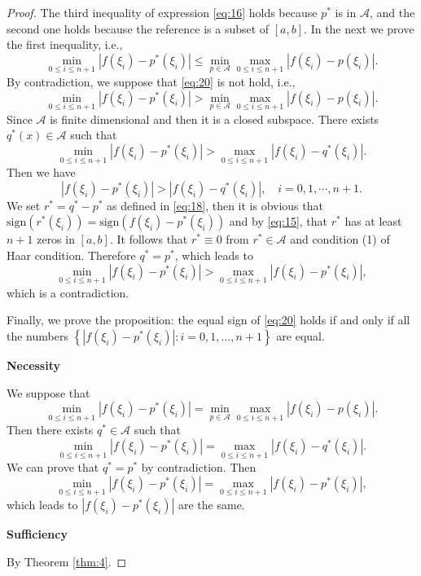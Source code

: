 \documentclass[11pt]{article}
\begin{document}
\begin{proof}
The third inequality of expression \eqref{eq:16} holds because $p^{*}$ is in $\mathscr{A}$, and the second one holds because the reference is a subset of $[a, b]$. In the next we prove the first inequality, i.e.,
\begin{equation}
\min_{0\leqslant i \leqslant n+1} |f(\xi_i) - p^*(\xi_i)| \leqslant 
\min_{p\in\mathscr{A}} \max_{0\leqslant i \leqslant n+1} |f(\xi_i) - p(\xi_i)|.
\label{eq:20}
\end{equation}
By contradiction, we suppose that \eqref{eq:20} is not hold, i.e.,
\[
\min_{0\leqslant i \leqslant n+1} |f(\xi_i) - p^*(\xi_i)| >
\min_{p\in\mathscr{A}} \max_{0\leqslant i \leqslant n+1} |f(\xi_i) - p(\xi_i)|.
\]
Since $\mathscr{A}$ is finite dimensional and then it is a closed subspace. There exists $q^*(x) \in \mathscr{A}$ such that
\[
\min_{0\leqslant i \leqslant n+1} |f(\xi_i) - p^*(\xi_i)| >
\max_{0\leqslant i \leqslant n+1} |f(\xi_i) - q^*(\xi_i)|.
\]
Then we have 
\[
|f(\xi_i) - p^*(\xi_i)| > |f(\xi_i) - q^*(\xi_i)|,\quad i=0,1,\cdots,n+1.
\]
We set $r^* = q^* - p^*$ as defined in \eqref{eq:18}, then it is obvious that 
$\mathrm{sign} (r^*(\xi_i) ) = \mathrm{sign} (f(\xi_i) - p^*(\xi_i))$ and by \eqref{eq:15},  that $r^*$ has at least $n+1$ zeros in $[a,b]$. It follows that $r^*\equiv 0$ from $r^*\in\mathscr{A}$ and condition (1) of Haar condition. Therefore $q^* = p^*$, which leads to
\[
\min_{0\leqslant i \leqslant n+1} |f(\xi_i) - p^*(\xi_i)| > \max_{0\leqslant i\leqslant n+1} |f(\xi_i) - p^*(\xi_i)|,
\]
which is a contradiction.

Finally, we prove the proposition: the equal sign of \eqref{eq:20} holds if and only if all the numbers $\left\{\left|f\left(\xi_{i}\right)-p^{*}\left(\xi_{i}\right)\right|: i=0,1, \ldots, n+1\right\}$ are equal.

{\bf Necessity}

We suppose that 
\[
\min_{0\leqslant i \leqslant n+1} |f(\xi_i) - p^*(\xi_i)| =
\min_{p\in\mathscr{A}} \max_{0\leqslant i \leqslant n+1} |f(\xi_i) - p(\xi_i)|.
\]
Then there exists $q^*\in\mathscr{A}$ such that
\[
\min_{0\leqslant i \leqslant n+1} |f(\xi_i) - p^*(\xi_i)| =
\max_{0\leqslant i \leqslant n+1} |f(\xi_i) - q^*(\xi_i)|.
\]
We can prove that $q^* = p^*$ by contradiction.
Then 
\[
\min_{0\leqslant i \leqslant n+1} |f(\xi_i) - p^*(\xi_i)| = \max_{0\leqslant i \leqslant n+1} |f(\xi_i) - p^*(\xi_i)|,
\]
which leads to $|f(\xi_i) - p^*(\xi_i)|$ are the same.

{\bf Sufficiency}

By Theorem \ref{thm:4}.

\end{proof}
\end{document}
